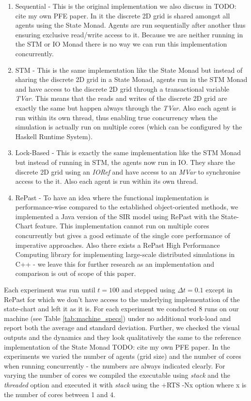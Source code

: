 \begin{enumerate}
	\item Sequential - This is the original implementation we also discuss in TODO: cite my own PFE paper. In it the discrete 2D grid is shared amongst all agents using the State Monad. Agents are run sequentially after another thus ensuring exclusive read/write access to it. Because we are neither running in the STM or IO Monad there is no way we can run this implementation concurrently.
	\item STM - This is the same implementation like the State Monad but instead of sharing the discrete 2D grid in a State Monad, agents run in the STM Monad and have access to the discrete 2D grid through a transactional variable \textit{TVar}. This means that the reads and writes of the discrete 2D grid are exactly the same but happen always through the \textit{TVar}. Also each agent is run within its own thread, thus enabling true concurrency when the simulation is actually run on multiple cores (which can be configured by the Haskell Runtime System).
	\item Lock-Based - This is exactly the same implementation like the STM Monad but instead of running in STM, the agents now run in IO. They share the discrete 2D grid using an \textit{IORef} and have access to an \textit{MVar} to synchronise access to the it. Also each agent is run within its own thread.
	\item RePast - To have an idea where the functional implementation is performance-wise compared to the established object-oriented methods, we implemented a Java version of the SIR model using RePast with the State-Chart feature. This implementation cannot run on multiple cores concurrently but gives a good estimate of the single core performance of imperative approaches. Also there exists a RePast High Performance Computing library for implementing large-scale distributed simulations in C++ - we leave this for further research as an implementation and comparison is out of scope of this paper.
\end{enumerate}

Each experiment was run until $t = 100$ and stepped using $\Delta t = 0.1$ except in RePast for which we don't have access to the underlying implementation of the state-chart and left it as it is. For each experiment we conducted 8 runs on our machine (see Table \ref{tab:machine_specs}) under no additional work-load and report both the average and standard deviation. Further, we checked the visual outputs and the dynamics and they look qualitatively the same to the reference implementation of the State Monad TODO: cite my own PFE paper. In the experiments we varied the number of agents (grid size) and the number of cores when running concurrently - the numbers are always indicated clearly. For varying the number of cores we compiled the executable using \textit{stack} and the \textit{threaded} option and executed it with \textit{stack} using the +RTS -Nx option where x is the number of cores between 1 and 4. 

